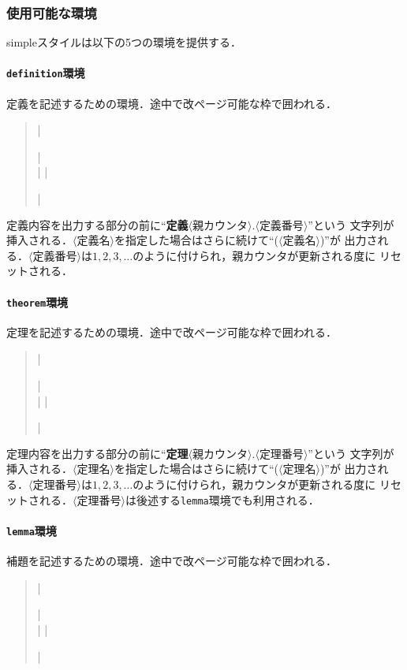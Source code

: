 \documentclass[a4paper,uplatex]{jsarticle}
\newcommand{\Meta}[1]{$\langle$\mbox{}#1\mbox{}$\rangle$}
\newenvironment{syntax}{\begin{quote}\small}{\end{quote}}
\begin{document}
\subsubsection{使用可能な環境}

\textsf{simple}スタイルは以下の5つの環境を提供する．

\paragraph{\texttt{definition}環境}\mbox{}\par
定義を記述するための環境．途中で改ページ可能な枠で囲われる．
%
\begin{syntax}
|\begin{definition}[|\Meta{定義名}|]| \\
|%
|\end{definition}|
\end{syntax}

定義内容を出力する部分の前に``\textbf{定義}\Meta{親カウンタ}.\Meta{定義番号}''という
文字列が挿入される．\Meta{定義名}を指定した場合はさらに続けて``(\Meta{定義名})''が
出力される．\Meta{定義番号}は$1,2,3,\dots$のように付けられ，親カウンタが更新される度に
リセットされる．

\paragraph{\texttt{theorem}環境}\mbox{}\par
定理を記述するための環境．途中で改ページ可能な枠で囲われる．
%
\begin{syntax}
|\begin{theorem}[|\Meta{定理名}|]| \\
|%
|\end{theorem}|
\end{syntax}

定理内容を出力する部分の前に``\textbf{定理}\Meta{親カウンタ}.\Meta{定理番号}''という
文字列が挿入される．\Meta{定理名}を指定した場合はさらに続けて``(\Meta{定理名})''が
出力される．\Meta{定理番号}は$1,2,3,\dots$のように付けられ，親カウンタが更新される度に
リセットされる．\Meta{定理番号}は後述する\texttt{lemma}環境でも利用される．

\paragraph{\texttt{lemma}環境}\mbox{}\par
補題を記述するための環境．途中で改ページ可能な枠で囲われる．
%
\begin{syntax}
|\begin{lemma}[|\Meta{補題名}|]| \\
|%
|\end{lemma}|
\end{syntax}
\end{document}
